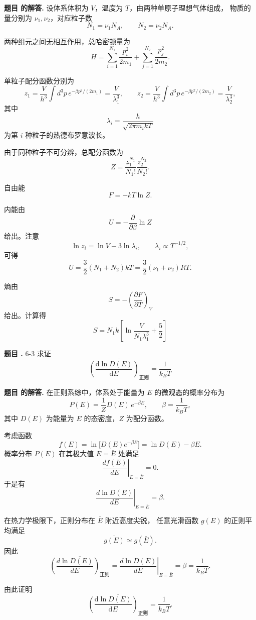 \documentclass[12pt, a4paper, oneside]{ctexart}
\newcounter{problemname}
\newenvironment{problem}
  {\begin{shaded}\stepcounter{problemname}\par\noindent\textbf{题目 \theproblemname. }}
  {\end{shaded}\par}
\newenvironment{solution}
  {\par\noindent\textbf{题目 \theproblemname 的解答. }}
  {\par}
\begin{document}
\begin{solution}
  设体系体积为 $V$，温度为 $T$，由两种单原子理想气体组成，
物质的量分别为 $\nu_1,\nu_2$，对应粒子数
\[
N_1=\nu_1 N_A,\qquad N_2=\nu_2 N_A .
\]

两种组元之间无相互作用，总哈密顿量为
\[
H=\sum_{i=1}^{N_1}\frac{p_i^2}{2m_1}
 +\sum_{j=1}^{N_2}\frac{p_j^2}{2m_2}.
\]


单粒子配分函数分别为
\[
z_1=\frac{V}{h^3}\int d^3p\,e^{-\beta p^2/(2m_1)}
= \frac{V}{\lambda_1^3},\qquad
z_2=\frac{V}{h^3}\int d^3p\,e^{-\beta p^2/(2m_2)}
= \frac{V}{\lambda_2^3},
\]
其中
\[
\lambda_i=\frac{h}{\sqrt{2\pi m_i kT}}
\]
为第 $i$ 种粒子的热德布罗意波长。

由于同种粒子不可分辨，总配分函数为
\[
Z=\frac{z_1^{N_1}}{N_1!}\frac{z_2^{N_2}}{N_2!}.
\]

自由能
\[
F=-kT\ln Z .
\]



内能由
\[
U=-\frac{\partial}{\partial\beta}\ln Z
\]
给出。注意
\[
\ln z_i=\ln V-3\ln\lambda_i,
\qquad
\lambda_i\propto T^{-1/2},
\]
可得
\[
U=\frac{3}{2}(N_1+N_2)kT
=\frac{3}{2}(\nu_1+\nu_2)RT.
\]



熵由
\[
S=-\left(\frac{\partial F}{\partial T}\right)_V
\]
给出。计算得
\[
S
= N_1 k\!\left[
\ln\!\frac{V}{N_1\lambda_1^3}+\frac{5}{2}
\right]
\]
\end{solution}

\begin{problem}{6-3}
求证
\begin{equation*}
\overline{\left( \frac{\mathrm{d} \ln D(E)}{\mathrm{d} E} \right)_{\text{正则}}} = \frac{1}{k_B T}
\end{equation*}
\end{problem}

\begin{solution}
  在正则系综中，体系处于能量为 $E$ 的微观态的概率分布为
\[
P(E)=\frac{1}{Z} D(E)\, e^{-\beta E},
\qquad 
\beta=\frac{1}{k_B T},
\]
其中 $D(E)$ 为能量为 $E$ 的态密度，$Z$ 为配分函数。

考虑函数
\[
f(E)=\ln\!\big[D(E)e^{-\beta E}\big]
= \ln D(E)-\beta E .
\]
概率分布 $P(E)$ 在其极大值 $E=\bar E$ 处满足
\[
\left.\frac{d f(E)}{dE}\right|_{E=\bar E}=0 .
\]
于是有
\[
\left.\frac{d\ln D(E)}{dE}\right|_{E=\bar E}=\beta .
\]

在热力学极限下，正则分布在 $\bar E$ 附近高度尖锐，
任意光滑函数 $g(E)$ 的正则平均满足
\[
\overline{g(E)} \simeq g(\bar E).
\]
因此
\[
\overline{\left(\frac{d\ln D(E)}{dE}\right)_{\text{正则}}}
= \left.\frac{d\ln D(E)}{dE}\right|_{E=\bar E}
= \beta
= \frac{1}{k_B T}.
\]

由此证明
\[
\boxed{
\overline{\left( \frac{\mathrm{d} \ln D(E)}{\mathrm{d} E} \right)_{\text{正则}}}
= \frac{1}{k_B T}
}.
\]
\end{solution}
\end{document}
